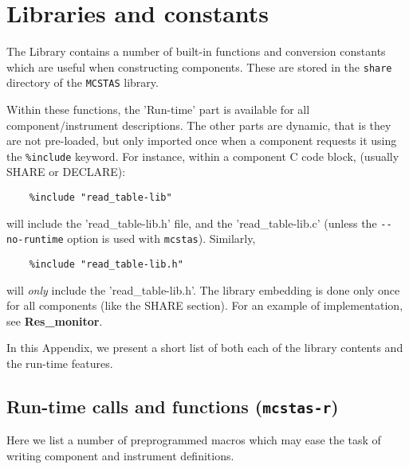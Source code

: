 
\chapter{Libraries and constants}
\label{c:kernelcalls}

The \MCS Library contains a number of built-in functions
and conversion constants which are useful when constructing
components. These are stored in the \verb+share+ directory of
the \verb+MCSTAS+ library. 

Within these functions, the 'Run-time' part is available for all
component/instrument descriptions. The other parts
are dynamic, that is they are not
pre-loaded, but only imported once when a component requests it
using the \verb+%include+ \MCS keyword. For instance, within a
component C code block, (usually SHARE or DECLARE):
\begin{lstlisting}
    %include "read_table-lib"
\end{lstlisting}
will include the 'read\_table-lib.h' file, and the 'read\_table-lib.c'
(unless the \verb+--no-runtime+ option is used with \verb+mcstas+).
Similarly,
\begin{lstlisting}
    %include "read_table-lib.h"
\end{lstlisting}
will \emph{only} include the 'read\_table-lib.h'.
The library embedding is done only once for all components (like the
 SHARE section).  For an example
of implementation, see \textbf{Res\_monitor}.

In this Appendix, we present a short list of both each of the library contents
and the run-time features.

\section{Run-time calls and functions (\texttt{mcstas-r})}
\label{s:calls:run-time}
Here we list a number of preprogrammed macros
which may ease the task of writing component and instrument definitions.

